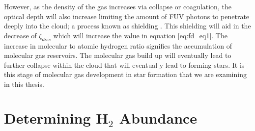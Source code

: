 However, as the density of the gas increases via collapse or coagulation, the optical depth will also increase limiting the amount of FUV photons to penetrate deeply into the cloud; a process known as shielding \citep{draine2011}.  This shielding will aid in the decrease of $\zeta_{diss}$ which will increase the value in equation \ref{eq:fd_eq1}.  The increase in molecular to atomic hydrogen ratio signifies the accumulation of molecular gas reservoirs.  The molecular gas build up will eventually lead to further collapse within the cloud that will eventual y lead to forming stars.  It is this stage of molecular gas development in star formation that we are examining in this thesis.

\section{Determining H$_2$ Abundance}






